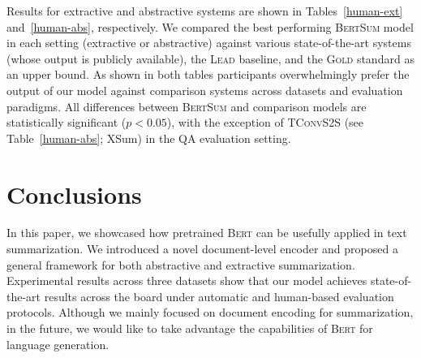 \documentclass[11pt,a4paper]{article}
\begin{document}
    
    Results for extractive and abstractive systems are shown in
    Tables~\ref{human-ext} and~\ref{human-abs}, respectively.  We compared
    the best performing \textsc{BertSum} model in each setting (extractive
    or abstractive) against various state-of-the-art systems (whose output
    is publicly available), the \textsc{Lead} baseline, and the
    \textsc{Gold} standard as an upper bound. As shown in both tables
    participants overwhelmingly prefer the output of our model against
    comparison systems across datasets and evaluation paradigms. All
    differences between \textsc{BertSum} and comparison models are
    statistically significant (\mbox{$p<0.05$}), with the exception of
    \textsc{TConvS2S} (see Table~\ref{human-abs}; XSum) in the QA
    evaluation setting.
    
    
    
    \section{Conclusions}
    \label{sec:conclusions}
    
    
    
    In this paper, we showcased how pretrained \textsc{Bert} can be
    usefully applied in text summarization. We introduced a novel
    document-level encoder and proposed a general framework for both
    abstractive and extractive summarization. Experimental results across
    three datasets show that our model achieves state-of-the-art results
    across the board under automatic and human-based evaluation
    protocols. Although we mainly focused on document encoding for
    summarization, in the future, we would like to take advantage the
    capabilities of \textsc{Bert} for language generation.
    
    
\end{document}
